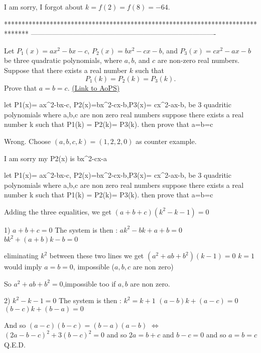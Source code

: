 \begin{solution}
	I am sorry, I forgot about $k=f(2)=f(8)=-64.$
\end{solution}
*******************************************************************************
-------------------------------------------------------------------------------

\begin{problem}
	Let $P_1(x)= ax^2-bx-c$, $P_2(x)=bx^2-cx-b$, and $P_3(x)= cx^2-ax-b$ be three quadratic polynomials, where $a,b$, and $c$ are non-zero real numbers. Suppose that there exists a real number $k$ such that \[P_1(k) = P_2(k)= P_3(k).\] Prove that $a=b=c$.
	\flushright \href{https://artofproblemsolving.com/community/c6h380700}{(Link to AoPS)}
\end{problem}



\begin{solution}
	\begin{tcolorbox}let P1(x)= ax^2-bx-c, P2(x)=bx^2-cx-b,P3(x)= cx^2-ax-b, be 3 quadritic polynomials  where a,b,c are non zero real numbers suppose there exists a real number k such that  P1(k) = P2(k)= P3(k). then prove that a=b=c\end{tcolorbox}
Wrong. Choose $(a,b,c,k)=(1,2,2,0)$ as counter example.
\end{solution}



\begin{solution}
	I am sorry my P2(x) is bx^2-cx-a
\end{solution}



\begin{solution}
	\begin{tcolorbox}let P1(x)= ax^2-bx-c, P2(x)=bx^2-cx-b,P3(x)= cx^2-ax-b, be 3 quadritic polynomials  where a,b,c are non zero real numbers suppose there exists a real number k such that  P1(k) = P2(k)= P3(k). then prove that a=b=c\end{tcolorbox}
Adding the three equalities, we get $(a+b+c)(k^2-k-1)=0$

1) $a+b+c=0$
The system is then :
$ak^2-bk+a+b=0$
$bk^2+(a+b)k-b=0$

eliminating $k^2$ between these two lines we get $(a^2+ab+b^2)(k-1)=0$
$k=1$ would imply $a=b=0$, impossible ($a,b,c$ are non zero)

So $a^2+ab+b^2=0$,impossible too if $a,b$ are non zero.

2) $k^2-k-1=0$
The system is then :
$k^2=k+1$
$(a-b)k+(a-c)=0$
$(b-c)k+(b-a)=0$

And so $(a-c)(b-c)=(b-a)(a-b)$ $\iff$ $(2a-b-c)^2+3(b-c)^2=0$ and so $2a=b+c$ and $b-c=0$ and so $a=b=c$
Q.E.D.
\end{solution}




